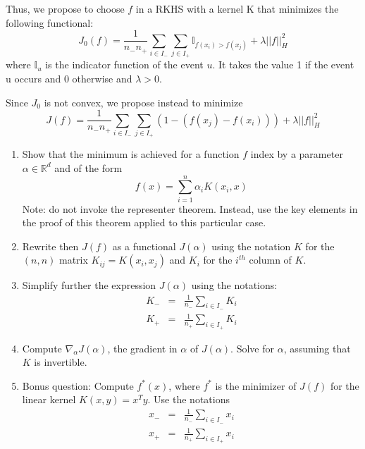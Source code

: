 \documentclass{article}[12pt]
\begin{document}
Thus, we propose to choose $f$ in a RKHS with a kernel K that minimizes the following functional:
\begin{equation}
J_0(f) = \frac{1}{n_- n_+}\sum_{i \in I_-}\sum_{j \in I_+} \mathbb{I}_{f(x_i)>f(x_j)} + \lambda ||f||_H^2
\end{equation}
 where $\mathbb{I}_u$ is the indicator function of the event $u$. It takes the value 1 if the event u occurs and 0 otherwise and $\lambda>0$. 

Since $J_0$ is not convex, we propose instead to minimize
\begin{equation}
J(f) = \frac{1}{n_- n_+}\sum_{i \in I_-}\sum_{j \in I_+}\left(1-\left(f(x_j)-f(x_i)\right)\right) + \lambda ||f||_H^2
\end{equation}
\newpage
\begin{enumerate}
\item Show that the minimum is achieved for a function $f$ index by a parameter $\alpha \in \mathbb{R}^d$ and of the form
\begin{equation}
f(x)=\sum_{i=1}^n \alpha_i K(x_i,x)
\end{equation}
Note: do not invoke the representer theorem. Instead, use the key elements in the proof of this theorem applied to this particular case. 
\newpage
\item Rewrite then $J(f)$ as a functional $J(\alpha)$ using the notation  $K$ for the $(n,n)$ matrix $K_{ij}=K(x_i,x_j)$ and $K_i$ for the $i^{th}$ column of $K$.
\newpage 
\item Simplify further the expression $J(\alpha)$ using the notations:
\begin{eqnarray}
K_-&=&\frac{1}{n_-}\sum_{i \in I_-}K_i\\
 K_+&=&\frac{1}{n_+}\sum_{i \in I_+}K_i
\end{eqnarray}

\newpage
\item Compute $\nabla_\alpha J(\alpha)$, the gradient in $\alpha$ of $J(\alpha)$. Solve for $\alpha$, assuming that $K$ 
is invertible. 
\newpage
\item Bonus question: Compute $f^*(x)$, where $f^*$ is the minimizer of $J(f)$ for the linear kernel $K(x,y)=x^Ty$. Use the notations
 \begin{eqnarray}
{x}_-&=&\frac{1}{n_-}\sum_{i \in I_-}x_i\\
{x}_+&=&\frac{1}{n_+}\sum_{i \in I_+}x_i
\end{eqnarray}
\end{enumerate}
\end{document}
